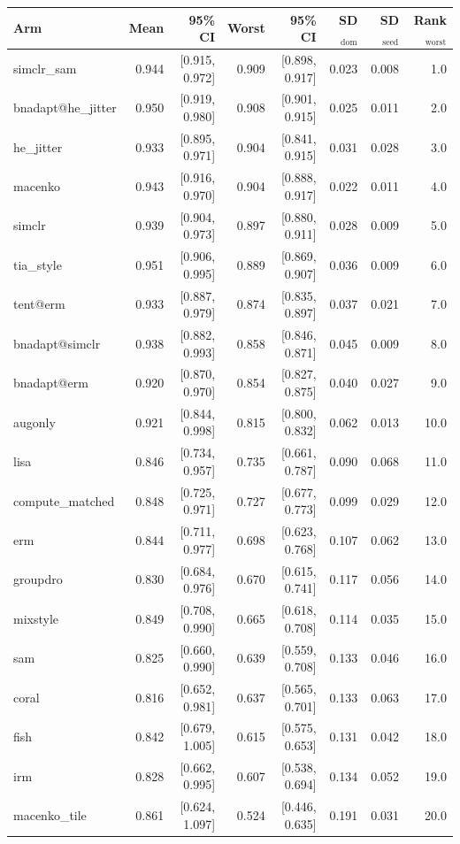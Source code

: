 \begin{tabular}{lrrrrrrr}
\toprule
Arm & Mean & 95\% CI & Worst & 95\% CI & SD$_\text{dom}$ & SD$_\text{seed}$ & Rank$_\text{worst}$ \\
\midrule
simclr\_sam & 0.944 & [0.915, 0.972] & 0.909 & [0.898, 0.917] & 0.023 & 0.008 & 1.0 \\
bnadapt@he\_jitter & 0.950 & [0.919, 0.980] & 0.908 & [0.901, 0.915] & 0.025 & 0.011 & 2.0 \\
he\_jitter & 0.933 & [0.895, 0.971] & 0.904 & [0.841, 0.915] & 0.031 & 0.028 & 3.0 \\
macenko & 0.943 & [0.916, 0.970] & 0.904 & [0.888, 0.917] & 0.022 & 0.011 & 4.0 \\
simclr & 0.939 & [0.904, 0.973] & 0.897 & [0.880, 0.911] & 0.028 & 0.009 & 5.0 \\
tia\_style & 0.951 & [0.906, 0.995] & 0.889 & [0.869, 0.907] & 0.036 & 0.009 & 6.0 \\
tent@erm & 0.933 & [0.887, 0.979] & 0.874 & [0.835, 0.897] & 0.037 & 0.021 & 7.0 \\
bnadapt@simclr & 0.938 & [0.882, 0.993] & 0.858 & [0.846, 0.871] & 0.045 & 0.009 & 8.0 \\
bnadapt@erm & 0.920 & [0.870, 0.970] & 0.854 & [0.827, 0.875] & 0.040 & 0.027 & 9.0 \\
augonly & 0.921 & [0.844, 0.998] & 0.815 & [0.800, 0.832] & 0.062 & 0.013 & 10.0 \\
lisa & 0.846 & [0.734, 0.957] & 0.735 & [0.661, 0.787] & 0.090 & 0.068 & 11.0 \\
compute\_matched & 0.848 & [0.725, 0.971] & 0.727 & [0.677, 0.773] & 0.099 & 0.029 & 12.0 \\
erm & 0.844 & [0.711, 0.977] & 0.698 & [0.623, 0.768] & 0.107 & 0.062 & 13.0 \\
groupdro & 0.830 & [0.684, 0.976] & 0.670 & [0.615, 0.741] & 0.117 & 0.056 & 14.0 \\
mixstyle & 0.849 & [0.708, 0.990] & 0.665 & [0.618, 0.708] & 0.114 & 0.035 & 15.0 \\
sam & 0.825 & [0.660, 0.990] & 0.639 & [0.559, 0.708] & 0.133 & 0.046 & 16.0 \\
coral & 0.816 & [0.652, 0.981] & 0.637 & [0.565, 0.701] & 0.133 & 0.063 & 17.0 \\
fish & 0.842 & [0.679, 1.005] & 0.615 & [0.575, 0.653] & 0.131 & 0.042 & 18.0 \\
irm & 0.828 & [0.662, 0.995] & 0.607 & [0.538, 0.694] & 0.134 & 0.052 & 19.0 \\
macenko\_tile & 0.861 & [0.624, 1.097] & 0.524 & [0.446, 0.635] & 0.191 & 0.031 & 20.0 \\
\bottomrule
\end{tabular}
